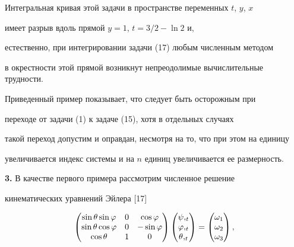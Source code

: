 Интегральная кривая этой задачи в пространстве  переменных $t$, $y$, $x$


имеет разрыв вдоль прямой $y=1$, $t=3/2-\ln 2$ и,


естественно, при интегрировании задачи (17) любым численным методом


в окрестности этой прямой возникнут непреодолимые вычислительные трудности.





Приведенный пример показывает, что следует быть осторожным при


переходе от задачи (1) к задаче (15), хотя в отдельных случаях


такой переход допустим и оправдан, несмотря на то, что при этом на единицу


увеличивается  индекс системы и на $n$ единиц увеличивается ее размерность.


\medskip





{\bf 3.} В качестве первого примера рассмотрим численное решение


кинематических уравнений Эйлера [17]


\begin{equation}


\begin{pmatrix}


\sin\theta\sin\f & 0 & \cos\f\\


\sin\theta\cos\f & 0 & -\sin\f\\


\cos\theta & 1 & 0


\end{pmatrix}


\begin{pmatrix}


\psi,_t\\ \f,_t\\ \theta,_t


\end{pmatrix}


=


\begin{pmatrix}


\omega_1\\ \omega_2\\ \omega_3


\end{pmatrix}


,


\end{equation}


